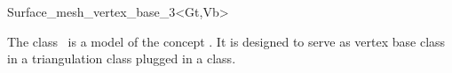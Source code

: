 

\begin{ccRefClass}{Surface_mesh_vertex_base_3<Gt,Vb>}  %


\ccDefinition
  
The class \ccRefName\ is a model of the concept
.
It is designed to serve  as vertex base  class
in a  triangulation class  
plugged in a   class.


\ccIsModel








\ccSeeAlso







\end{ccRefClass}



